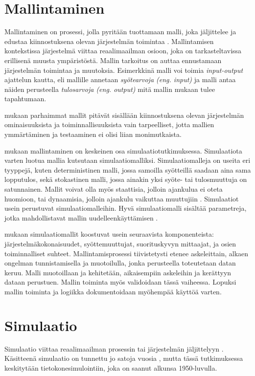 \documentclass[utf8]{gradu3}
\begin{document}
\section{Mallintaminen} \label{mallintaminen}
Mallintaminen on prosessi, jolla pyritään tuottamaan malli, joka jäljittelee 
ja edustaa kiinnostuksena olevan järjestelmän toimintaa \parencite{maria1997introduction}. 
Mallintamisen kontekstissa järjestelmä viittaa reaalimaailman osioon, 
joka on tarkasteltavissa erillisenä muusta ympäristöstä.
Mallin tarkoitus on auttaa ennustamaan järjestelmän toimintaa ja muutoksia.
Esimerkkinä malli voi toimia \textit{input-output} ajattelun kautta, 
eli mallille annetaan \textit{syötearvoja (eng. input)} ja malli antaa näiden perusteella
\textit{tulosarvoja (eng. output)} mitä mallin mukaan tulee tapahtumaan.

\textcite{maria1997introduction} mukaan parhaimmat mallit pitävät 
sisällään kiinnostuksena olevan järjestelmän 
ominaisuuksista ja toiminnallisuuksista vain tarpeelliset, 
jotta mallien ymmärtäminen ja testaaminen ei olisi liian monimutkaista.

\textcite{maria1997introduction} mukaan mallintaminen on keskeinen osa simulaatiotutkimuksessa.
Simulaatiota varten luotua mallia kutsutaan simulaatiomalliksi.
Simulaatiomalleja on useita eri tyyppejä, kuten deterministinen malli, 
jossa samoilla syötteillä saadaan aina sama lopputulos, 
sekä stokastinen malli, jossa ainakin yksi syöte- tai tulosmuuttuja on satunnainen. 
Mallit voivat olla myös staattisia, jolloin ajankulua ei oteta huomioon, 
tai dynaamisia, jolloin ajankulu vaikuttaa muuttujiin \parencite{maria1997introduction}. 
Simulaatiot usein perustuvat simulaatiomalleihin. 
Hyvä simulaatiomalli sisältää parametreja,
jotka mahdollistavat mallin uudelleenkäyttämisen \parencite{introduction2005simulation}. 

\textcite{maria1997introduction} mukaan simulaatiomallit koostuvat usein seuraavista komponenteista: järjestelmäkokonaisuudet, syöttemuuttujat, suorituskyvyn mittaajat,
ja osien toiminnalliset suhteet. Mallintamisprosessi tiivistetysti etenee askeleittain, alkaen ongelman tunnistamisella ja muotoilulla, 
jonka perusteella toteutetaan datan keruu. Malli muotoillaan ja kehitetään, 
aikaisempiin askeleihin ja kerättyyn dataan perustuen. Mallin toiminta myös validoidaan tässä vaiheessa. 
Lopuksi mallin toiminta ja logiikka dokumentoidaan myöhempää käyttöä varten.

\section{Simulaatio} \label{simulaatio}
Simulaatio viittaa reaalimaailman prosessin tai 
järjestelmän jäljittelyyn \parencite{banks1999introduction}. 
Käsitteenä simulaatio on tunnettu jo satoja vuosia
\parencite{HistoryOfSimulation}, 
mutta tässä tutkimuksessa keskitytään tietokonesimulointiin, 
joka on saanut alkunsa 1950-luvulla. 
%
\parencites%
    {HistoryOfSimulation}%
    {historyOfSimulation1996}
\relax
\end{document}
